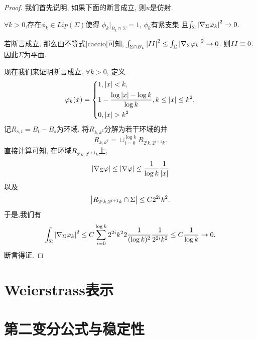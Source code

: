 \begin{proof}
    我们首先说明, 如果下面的断言成立, 则$u$是仿射.
    \begin{claim}
        $\forall k >0$,存在$\phi_k \in Lip(\Sigma)$使得  $\phi_k|_{B_k \cap \Sigma}=1$, $\phi_k$有紧支集 且$ \int_\Sigma \left | \nabla_\Sigma \varphi_k \right |^2 \to 0$.
    \end{claim}
    若断言成立, 那么由不等式\eqref{caccio}可知, $\int_{\Sigma\cap B_k} \left | II \right |^2 \le \int_\Sigma \left | \nabla_\Sigma \varphi_k \right |^2 \to 0$. 则$II\equiv 0$. 因此$\Sigma$为平面. 
    \par 现在我们来证明断言成立. $\forall k>0$, 定义
    \begin{equation}
        \varphi_k(x)=\left\{
            \begin{aligned}
                &1, \left | x \right | < k, \\
                &1-\frac{\log\left | x \right |-\log k}{\log k}, k \le \left | x \right | \le k^2,\\
                &0, \left | x \right | > k^2
            \end{aligned}
        \right.
    \end{equation}
    记$R_{s,t}=B_t-B_s$为环域. 将$R_{k,k^2}$分解为若干环域的并 
    \begin{equation}
        R_{k,k^2}=\cup_{i=0}^{\log k} R_{2^ik,2^{i+1}k}.
    \end{equation}
    直接计算可知, 在环域$R_{2^ik,2^{i+1}k}$上,
    \begin{equation}
        \left | \nabla_\Sigma \varphi \right | \le \left | \nabla \varphi \right | \le \frac{1}{\log k} \frac{1}{\left | x \right |}
    \end{equation}
    以及
    \begin{equation}
        \left | R_{2^ik,2^{i+1}k} \cap \Sigma  \right | \le C 2^{2i}k^2. 
    \end{equation}
    于是,我们有
    \begin{equation}
        \int_\Sigma \left | \nabla_\Sigma \varphi_k \right |^2 \le C\sum_{i=0}^{\log k} 2^{2i}k^22\frac{1}{(\log k)^2} \frac{1}{2^{2i}k^2} \le C\frac{1}{\log k} \to 0.
    \end{equation}
    断言得证.
\end{proof}
\section{Weierstrass表示}
\section{第二变分公式与稳定性}